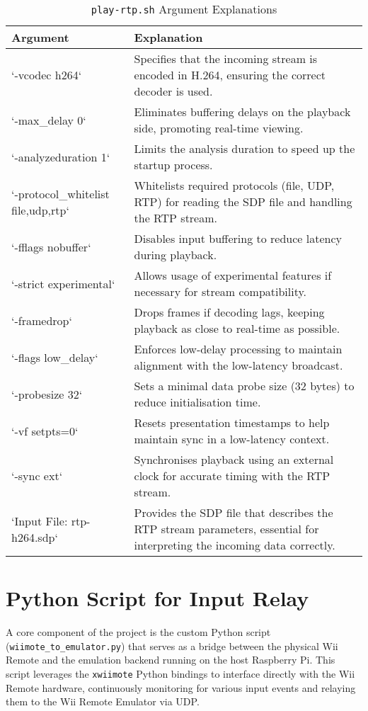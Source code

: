 \begin{table}[!ht]
    \centering
    \begin{tabular}{|p{5cm}|p{10cm}|}
    \hline
        Argument & Explanation \\ \hline
        `-vcodec h264` & Specifies that the incoming stream is encoded in H.264, ensuring the correct decoder is used. \\ \hline
        `-max\_delay 0` & Eliminates buffering delays on the playback side, promoting real-time viewing. \\ \hline
        `-analyzeduration 1` & Limits the analysis duration to speed up the startup process. \\ \hline
        `-protocol\_whitelist file,udp,rtp` & Whitelists required protocols (file, UDP, RTP) for reading the SDP file and handling the RTP stream. \\ \hline
        `-fflags nobuffer` & Disables input buffering to reduce latency during playback. \\ \hline
        `-strict experimental` & Allows usage of experimental features if necessary for stream compatibility. \\ \hline
        `-framedrop` & Drops frames if decoding lags, keeping playback as close to real-time as possible. \\ \hline
        `-flags low\_delay` & Enforces low-delay processing to maintain alignment with the low-latency broadcast. \\ \hline
        `-probesize 32` & Sets a minimal data probe size (32 bytes) to reduce initialisation time. \\ \hline
        `-vf setpts=0` & Resets presentation timestamps to help maintain sync in a low-latency context. \\ \hline
        `-sync ext` & Synchronises playback using an external clock for accurate timing with the RTP stream. \\ \hline
        `Input File: rtp-h264.sdp` & Provides the SDP file that describes the RTP stream parameters, essential for interpreting the incoming data correctly. \\ \hline
    \end{tabular}
\caption{\texttt{play-rtp.sh} Argument Explanations}
    \label{tab:play-args}

\end{table}




\section{Python Script for Input Relay}
A core component of the project is the custom Python script
(\texttt{wiimote\_to\_emulator.py}) that serves as a bridge between the physical
Wii Remote and the emulation backend running on the host Raspberry Pi. This
script leverages the \texttt{xwiimote} Python bindings to interface directly
with the Wii Remote hardware, continuously monitoring for various input events
and relaying them to the Wii Remote Emulator via UDP.

